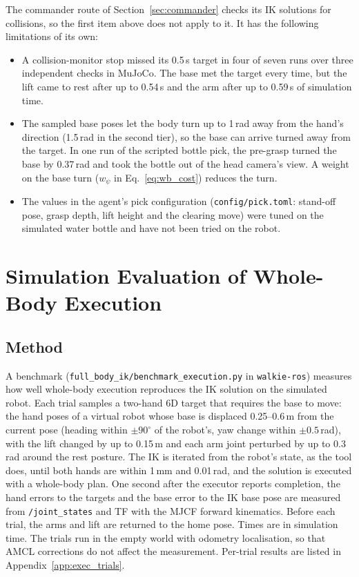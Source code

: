 \documentclass[12pt,a4paper]{article}
\begin{document}
The commander route of Section~\ref{sec:commander} checks its IK solutions for collisions, so the first
item above does not apply to it. It has the following limitations of its own:
\begin{itemize}
    \item A collision-monitor stop missed its 0.5\,s target in four of seven runs over three independent
          checks in MuJoCo. The base met the target every time, but the lift came to rest after up to
          0.54\,s and the arm after up to 0.59\,s of simulation time.
    \item The sampled base poses let the body turn up to 1\,rad away from the hand's direction (1.5\,rad
          in the second tier), so the base can arrive turned away from the target. In one run of the
          scripted bottle pick, the pre-grasp turned the base by 0.37\,rad and took the bottle out of the
          head camera's view. A weight on the base turn ($w_{\psi}$ in Eq.~\eqref{eq:wb_cost}) reduces
          the turn.
    \item The values in the agent's pick configuration (\texttt{config/pick.toml}: stand-off pose, grasp
          depth, lift height and the clearing move) were tuned on the simulated water bottle and have not
          been tried on the robot.
\end{itemize}

\section{Simulation Evaluation of Whole-Body Execution}
\label{sec:exec_eval}

\subsection{Method}

A benchmark (\texttt{full\_body\_ik/benchmark\_execution.py} in \texttt{walkie-ros}) measures how well
whole-body execution reproduces the IK solution on the simulated robot. Each trial samples a two-hand
6D target that requires the base to move: the hand poses of a virtual robot whose base is displaced
0.25--0.6\,m from the current pose (heading within $\pm90^\circ$ of the robot's, yaw change within
$\pm0.5$\,rad), with the lift changed by up to 0.15\,m and each arm joint perturbed by up to 0.3\,rad
around the rest posture. The IK is iterated from the robot's state, as the tool does, until both hands
are within 1\,mm and 0.01\,rad, and the solution is executed with a whole-body plan. One second after
the executor reports completion, the hand errors to the targets and the base error to the IK base pose
are measured from \texttt{/joint\_states} and TF with the MJCF forward kinematics. Before each trial,
the arms and lift are returned to the home pose. Times are in simulation time. The trials run in the
empty world with odometry localisation, so that AMCL corrections do not affect the measurement.
Per-trial results are listed in Appendix~\ref{app:exec_trials}.
\end{document}
